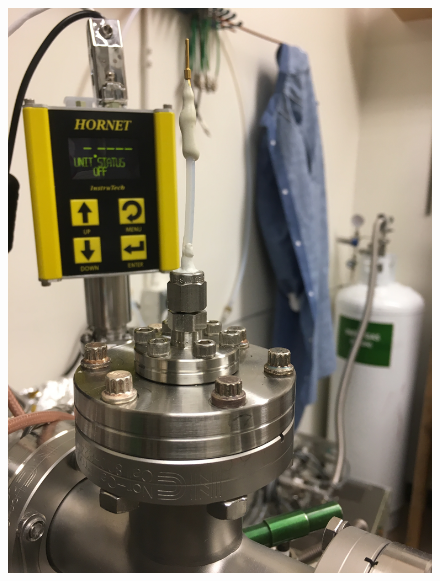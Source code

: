 \begin{figure}[htbp]
\begin{minipage}{0.32\textwidth}
    \includegraphics[width=\linewidth, angle=270]{figures/testbed/ft6_4.jpg}
    \end{minipage}
    \hspace{\fill} %
    \begin{minipage}{0.32\textwidth}

\end{minipage}
\end{figure}
